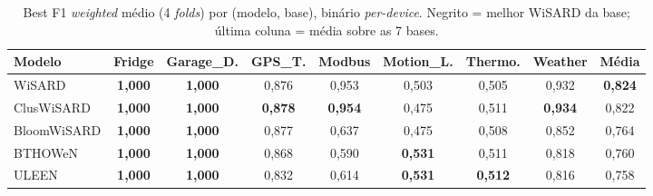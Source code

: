 \begin{table}[ht]
  \centering
  \caption{Best F1 \emph{weighted} médio (4 \emph{folds}) por (modelo,
           base), binário \emph{per-device}. Negrito = melhor
           WiSARD da base; última coluna = média sobre as 7 bases.}
  \label{tab:wisard_best_f1}
  \scriptsize
  \begin{tabular}{lcccccccc}
    \toprule
    \textbf{Modelo} & \textbf{Fridge} & \textbf{Garage\_D.} & \textbf{GPS\_T.} & \textbf{Modbus} & \textbf{Motion\_L.} & \textbf{Thermo.} & \textbf{Weather} & \textbf{Média} \\
    \midrule
    WiSARD       & \textbf{1{,}000} & \textbf{1{,}000} & 0{,}876 & 0{,}953 & 0{,}503 & 0{,}505 & 0{,}932 & \textbf{0{,}824} \\
    ClusWiSARD   & \textbf{1{,}000} & \textbf{1{,}000} & \textbf{0{,}878} & \textbf{0{,}954} & 0{,}475 & 0{,}511 & \textbf{0{,}934} & 0{,}822 \\
    BloomWiSARD  & \textbf{1{,}000} & \textbf{1{,}000} & 0{,}877 & 0{,}637 & 0{,}475 & 0{,}508 & 0{,}852 & 0{,}764 \\
    BTHOWeN      & \textbf{1{,}000} & \textbf{1{,}000} & 0{,}868 & 0{,}590 & \textbf{0{,}531} & 0{,}511 & 0{,}818 & 0{,}760 \\
    ULEEN        & \textbf{1{,}000} & \textbf{1{,}000} & 0{,}832 & 0{,}614 & \textbf{0{,}531} & \textbf{0{,}512} & 0{,}816 & 0{,}758 \\
    \bottomrule
  \end{tabular}
\end{table}

